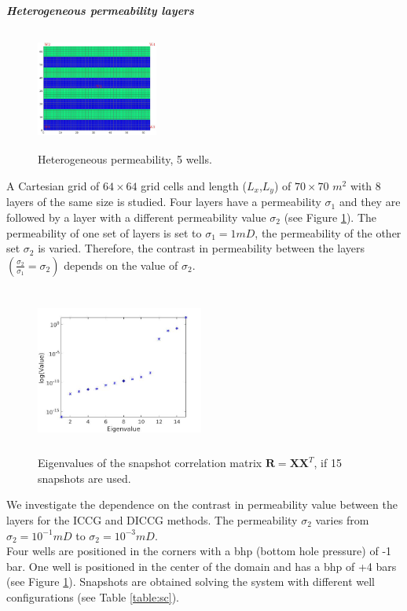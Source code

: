 \documentclass[review]{elsarticle}
\begin{document}
\normalsize
\newpage
\emph{\textbf{Heterogeneous permeability layers}}\\

\begin{figure}
\centering 
\vspace{-10pt}
\includegraphics[width=4cm,height=4cm,keepaspectratio]{images/perm64.jpg}
\caption{ Heterogeneous permeability, 5 wells.}\label{fig:hep_2}
\vspace{-10pt}
\end{figure} 
A Cartesian grid of $64\times64$ grid cells and length ($L_x$,$L_y$) of $70\times70$ $m^2$ with 8 layers of the same size is studied. Four layers have a permeability  $\sigma_1$ and they are followed by a layer with a different permeability value $\sigma_2$ (see Figure \ref{fig:hep_2}). The permeability of one set of layers is set to $\sigma_1=1mD$, the permeability of the other set $\sigma_2$ is varied. 
Therefore, the contrast in permeability between the layers $(\frac{\sigma_2}{\sigma_1}=\sigma_2)$
depends on the value of $\sigma_2$.\\
\begin{figure}
\vspace{-10pt}
 \centering
\includegraphics[width=5.5cm,height=5.5cm,keepaspectratio]
{images/eig_pod64.jpg}
\caption{Eigenvalues of the snapshot correlation matrix $\mathbf{R}=\mathbf{X}\mathbf{X}^T$, if 15 snapshots are used.}
\vspace{-5pt}
\label{fig:eig}
\end{figure}
We investigate the dependence on the contrast in permeability value between the layers for the ICCG and DICCG methods.
The permeability  $\sigma_2$ varies from $\sigma_2=10^{-1}mD$ to $\sigma_2=10^{-3}mD$. \\
Four wells are positioned in the corners with a bhp (bottom hole pressure) of -1 bar. One well is positioned in the center of the domain and has a bhp of +4 bars
(see Figure \ref{fig:hep_2}). Snapshots are obtained solving the system with different well
configurations (see Table \ref{table:sc}).
\end{document}
